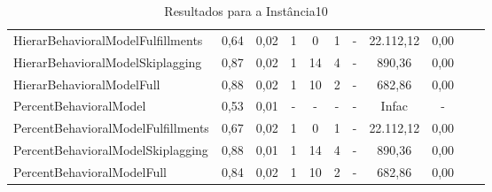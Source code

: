 \begin{table}[h!]
{\begin{tabular}{lcccccccccc}
			HierarBehavioralModelFulfillments  & 0,64   & 0,02 & 1 & 0   & 1 & -          & 22.112,12 & 0,00 \\ 
			HierarBehavioralModelSkiplagging   & 0,87   & 0,02 & 1 & 14  & 4 & -          & 890,36    & 0,00 \\ 
			HierarBehavioralModelFull          & 0,88   & 0,02 & 1 & 10  & 2 & -          & 682,86    & 0,00 \\ \hline
			PercentBehavioralModel             & 0,53   & 0,01 & - & -   & - & -          & Infac     & - \\ 
			PercentBehavioralModelFulfillments & 0,67   & 0,02 & 1 & 0   & 1 & -          & 22.112,12 & 0,00 \\ 
			PercentBehavioralModelSkiplagging  & 0,88   & 0,01 & 1 & 14  & 4 & -          & 890,36    & 0,00 \\ 
			PercentBehavioralModelFull         & 0,84   & 0,02 & 1 & 10  & 2 & -          & 682,86    & 0,00 \\ \hline
		\end{tabular}%
	}
	\caption{Resultados para a Instância10}
	\label{tab:resul_instan10}
\end{table}


